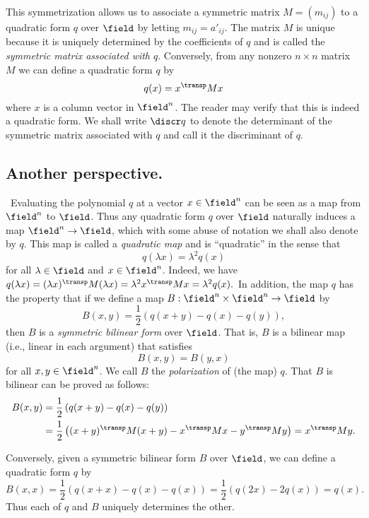 This symmetrization allows us to associate a symmetric matrix \(M = (m_{ij})\) to a quadratic form \(q\) over \(\field\) by letting \(m_{ij} = a'_{ij}\). The matrix \(M\) is unique because it is uniquely determined by the coefficients of \(q\) and is called the \emph{symmetric matrix associated with \(q\)}. Conversely, from any nonzero \(n \times n\) matrix \(M\) we can define a quadratic form \(q\) by
\[
  q(x) = x^{\transp}Mx
\]
where \(x\) is a column vector in \(\field^n\). The reader may verify that this is indeed a quadratic form. We shall write \(\discr q\) to denote the determinant of the symmetric matrix associated with \(q\) and call it the discriminant of \(q\).\label{sec:quadratic-forms-matrix-representation}

\subsection{Another perspective.}~Evaluating the polynomial \(q\) at a vector \(x \in \field^n\) can be seen as a map from \(\field^n\) to \(\field\). Thus any quadratic form \(q\) over \(\field\) naturally induces a map \(\field^n \to \field\), which with some abuse of notation we shall also denote by \(q\). This map is called a \emph{quadratic map} and is ``quadratic'' in the sense that\label{sec:quadratic-maps}
\[q(\lambda x) = \lambda^2q(x)\]
for all \(\lambda \in \field\) and \(x \in \field^n\). Indeed, we have \(q(\lambda x) = (\lambda x)^{\transp}M(\lambda x)  = \lambda^2 x^{\transp}Mx = \lambda^2 q(x).\) In addition, the map \(q\) has the property that if we define a map \(B : \field^n \times \field^n \to \field\) by
\[
  B(x, y) = \frac{1}{2}\left(q(x+y) - q(x) - q(y)\right),
\]
then \(B\) is a \emph{symmetric bilinear form} over \(\field\). That is, \(B\) is a bilinear map (i.e., linear in each argument) that satisfies
\[
  B(x, y) = B(y, x)
\]
for all \(x, y \in \field^n\). We call \(B\) the \emph{polarization} of (the map) \(q\). That \(B\) is bilinear can be proved as follows:
\begin{align*}
  B(x,y) &= \frac{1}{2}\left(q(x+y) - q(x) - q(y)\right)\\
  &= \frac{1}{2}\left( (x+y)^{\transp}M(x+y) - x^{\transp}Mx - y^{\transp}My \right) = x^{\transp}My.
\end{align*}

Conversely, given a symmetric bilinear form \(B\) over \(\field\), we can define a quadratic form \(q\) by
\[B(x, x) = \frac{1}{2}\left(q(x+x) - q(x) - q(x)\right)
=\frac{1}{2}\left(q(2x) - 2q(x)\right) = q(x).\]
Thus each of \(q\) and \(B\) uniquely determines the other.

